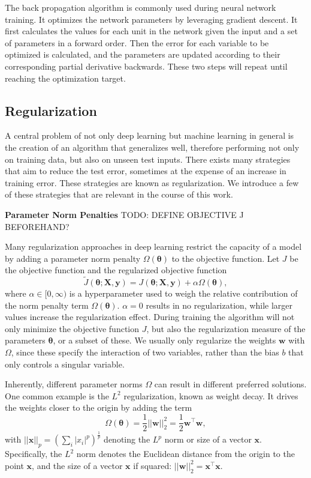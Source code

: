 The back propagation algorithm is commonly used during neural network training. It optimizes the network parameters by leveraging gradient descent. It first calculates the values for each unit in the network given the input and a set of parameters in a forward order. Then the error for each variable to be optimized is calculated, and the parameters are updated according to their corresponding partial derivative backwards. These two steps will repeat until reaching the optimization target.

\subsection{Regularization}
A central problem of not only deep learning but machine learning in general is the creation of an algorithm that generalizes well, therefore performing not only on training data, but also on unseen test inputs. There exists many strategies that aim to reduce the test error, sometimes at the expense of an increase in training error. These strategies are known as regularization. We introduce a few of these strategies that are relevant in the course of this work.

\textbf{Parameter Norm Penalties}
TODO: DEFINE OBJECTIVE J BEFOREHAND?

Many regularization approaches in deep learning restrict the capacity of a model by adding a parameter norm penalty $\Omega(\boldsymbol{\theta})$ to the objective function. Let $J$ be the objective function and the regularized objective function
\begin{equation}
    \tilde{J}(\boldsymbol{\theta}; \mathbf{X}, \mathbf{y}) = J(\boldsymbol{\theta}; \mathbf{X}, \mathbf{y}) + \alpha\Omega(\boldsymbol{\theta}),
\end{equation}
where $\alpha \in [0,\infty)$ is a hyperparameter used to weigh the relative contribution of the norm penalty term $\Omega(\boldsymbol{\theta})$. $\alpha=0$ results in no regularization, while larger values increase the regularization effect. During training the algorithm will not only minimize the objective function $J$, but also the regularization measure of the parameters $\boldsymbol{\theta}$, or a subset of these. We usually only regularize the weights $\mathbf{w}$ with $\Omega$, since these specify the interaction of two variables, rather than the bias $b$ that only controls a singular variable.

Inherently, different parameter norms $\Omega$ can result in different preferred solutions. One common example is the $L^2$ regularization, known as weight decay. It drives the weights closer to the origin by adding the term
\begin{equation}
    \Omega(\boldsymbol{\theta}) = \frac{1}{2}||\mathbf{w}||_2^2 = \frac{1}{2}\mathbf{w}^\top \mathbf{w},
\end{equation}
with $||\mathbf{x}||_p = (\sum_i |x_i|^p)^\frac{1}{p}$ denoting the $L^p$ norm or size of a vector $\mathbf{x}$. Specifically, the $L^2$ norm denotes the Euclidean distance from the origin to the point $\mathbf{x}$, and the size of a vector $\mathbf{x}$ if squared: $||\mathbf{w}||_2^2 = \mathbf{x}^\top \mathbf{x}$.

